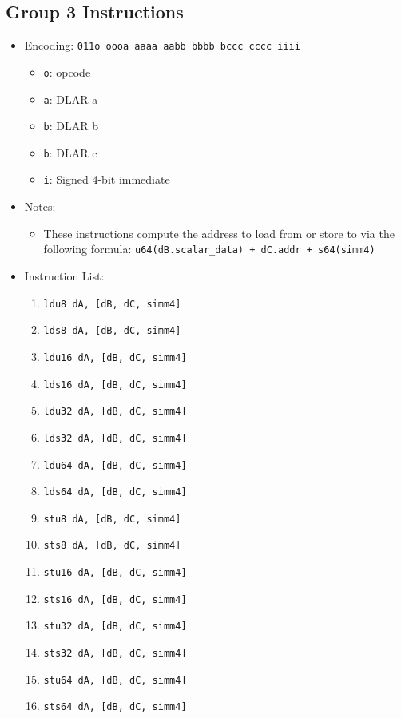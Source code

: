 \documentclass{article}
\begin{document}
	\subsection{Group 3 Instructions}
		\begin{itemize}
		\item Encoding:  \texttt{011o oooa aaaa aabb  bbbb bccc cccc iiii}
			\begin{itemize}
			\item \texttt{o}:  opcode
			\item \texttt{a}:  DLAR a
			\item \texttt{b}:  DLAR b
			\item \texttt{b}:  DLAR c
			\item \texttt{i}:  Signed 4-bit immediate
			\end{itemize}
		\item Notes:
			\begin{itemize}
			\item These instructions compute the address to load from or
				store to via the following formula:
				\texttt{u64(dB.scalar\_data) + dC.addr + s64(simm4)}
			\end{itemize}
		\item Instruction List:
			\begin{enumerate}
			\item \texttt{ldu8 dA, [dB, dC, simm4]}
			\item \texttt{lds8 dA, [dB, dC, simm4]}
			\item \texttt{ldu16 dA, [dB, dC, simm4]}
			\item \texttt{lds16 dA, [dB, dC, simm4]}

			\item \texttt{ldu32 dA, [dB, dC, simm4]}
			\item \texttt{lds32 dA, [dB, dC, simm4]}
			\item \texttt{ldu64 dA, [dB, dC, simm4]}
			\item \texttt{lds64 dA, [dB, dC, simm4]}

			\item \texttt{stu8 dA, [dB, dC, simm4]}
			\item \texttt{sts8 dA, [dB, dC, simm4]}
			\item \texttt{stu16 dA, [dB, dC, simm4]}
			\item \texttt{sts16 dA, [dB, dC, simm4]}

			\item \texttt{stu32 dA, [dB, dC, simm4]}
			\item \texttt{sts32 dA, [dB, dC, simm4]}
			\item \texttt{stu64 dA, [dB, dC, simm4]}
			\item \texttt{sts64 dA, [dB, dC, simm4]}
			\end{enumerate}
		\end{itemize}
\end{document}
